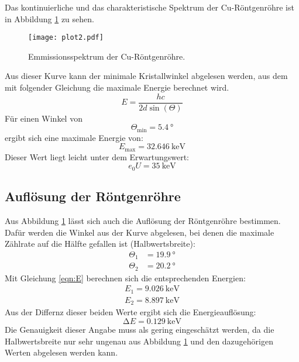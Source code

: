 Das kontinuierliche und das charakteristische Spektrum der Cu-Röntgenröhre ist in Abbildung \ref{fig:plot2} zu sehen.
\begin{figure}
  \centering
  \texttt{[image: plot2.pdf]}
  \caption{Emmissionsspektrum der Cu-Röntgenröhre.}
  \label{fig:plot2}
\end{figure}
Aus dieser Kurve kann der minimale Kristallwinkel abgelesen werden, aus dem mit folgender Gleichung die maximale Energie berechnet wird.
\begin{equation}
  E = \frac{h c}{2d \sin(\Theta)}
  \label{eqn:E}
\end{equation}
Für einen Winkel von
\begin{equation*}
  \Theta_\text{min} = \SI{5.4}{\degree}
\end{equation*}
ergibt sich eine maximale Energie von:
\begin{equation*}
  E_\text{max} = \SI{32.646}{\kilo\eV}
\end{equation*}
Dieser Wert liegt leicht unter dem Erwartungswert:
\begin{equation*}
  e_0 U = \SI{35}{\kilo\eV}
\end{equation*}
\FloatBarrier

\subsection{Auflösung der Röntgenröhre}

Aus Abbildung \ref{fig:plot2} lässt sich auch die Auflösung der Röntgenröhre bestimmen.
Dafür werden die Winkel aus der Kurve abgelesen, bei denen die maximale Zählrate auf die Hälfte gefallen ist (Halbwertsbreite):
\begin{align*}
  \Theta_1 &= \SI{19.9}{\degree} \\
  \Theta_2 &= \SI{20.2}{\degree}
\end{align*}
Mit Gleichung \eqref{eqn:E} berechnen sich die entsprechenden Energien:
\begin{align*}
  E_1 = \SI{9.026}{\kilo\eV} \\
  E_2 = \SI{8.897}{\kilo\eV}
\end{align*}
Aus der Differnz dieser beiden Werte ergibt sich die Energieauflösung:
\begin{equation*}
 \increment E = \SI{0.129}{\kilo\eV}
\end{equation*}
Die Genauigkeit dieser Angabe muss als gering eingeschätzt werden, da die Halbwertsbreite nur sehr ungenau aus Abbildung \ref{fig:plot2} und den dazugehörigen Werten abgelesen werden kann.

